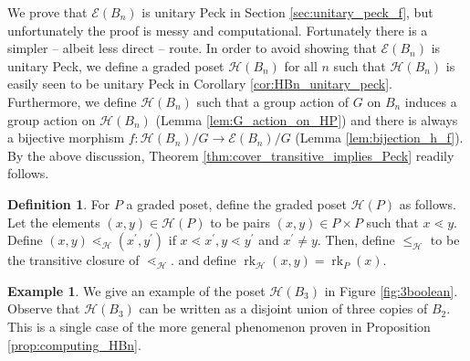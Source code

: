 \documentclass[10 pt]{amsart}
\theoremstyle{plain}
\theoremstyle{definition}
\newtheorem{defn}[thm]{Definition}
\newtheorem{eg}[thm]{Example}
\theoremstyle{remark}
\numberwithin{equation}{section}
\newcommand\rk{\operatorname{rk}}
\begin{document}
We prove that $\mathcal E(B_n)$ is unitary Peck in Section \ref{sec:unitary_peck_f}, but unfortunately the proof is messy and computational.  Fortunately there is a simpler -- albeit less direct -- route.  In order to avoid showing that $\mathcal E(B_n)$ is unitary Peck, we define a graded poset $\mathcal{H}(B_n)$ for all $n$ such that $\mathcal{H}(B_n)$ is easily seen to be unitary Peck in Corollary \ref{cor:HBn_unitary_peck}. Furthermore, we define $\mathcal{H}(B_n)$ such that a group action of $G$ on $B_n$ induces a group action on $\mathcal{H}(B_n)$ (Lemma \ref{lem:G_action_on_HP}) and there is always a bijective morphism $f\colon \mathcal{H}(B_n)/G\rightarrow \mathcal E(B_n)/G$ (Lemma \ref{lem:bijection_h_f}).  By the above discussion, Theorem \ref{thm:cover_transitive_implies_Peck} readily follows.

\begin{defn}
\label{defn:h_map}
For $P$ a graded poset, define the graded poset $\mathcal H(P)$ as follows. Let the elements $(x, y) \in \mathcal H(P)$ to be pairs $(x,y) \in P\times P$ such that $x \lessdot y$.  Define $(x, y) \lessdot_{\mathcal H} (x^\prime, y^\prime)$ if $x \lessdot x^\prime,y\lessdot y^\prime$ and $x^\prime \neq y.$ Then, define $\leq_{\mathcal H}$ to be the transitive closure of $\lessdot_{\mathcal H}.$ and define $\rk_{\mathcal H}(x, y) = \rk_P(x).$
\end{defn}


\begin{eg}
\label{eg:3boolean}
We give an example of the poset $\mathcal H(B_3)$ in Figure \ref{fig:3boolean}. Observe that $\mathcal H(B_3)$ can be written as a disjoint union of three copies of $B_2.$ This is a single case of the more general phenomenon proven in Proposition \ref{prop:computing_HBn}.
\end{eg}
\end{document}
